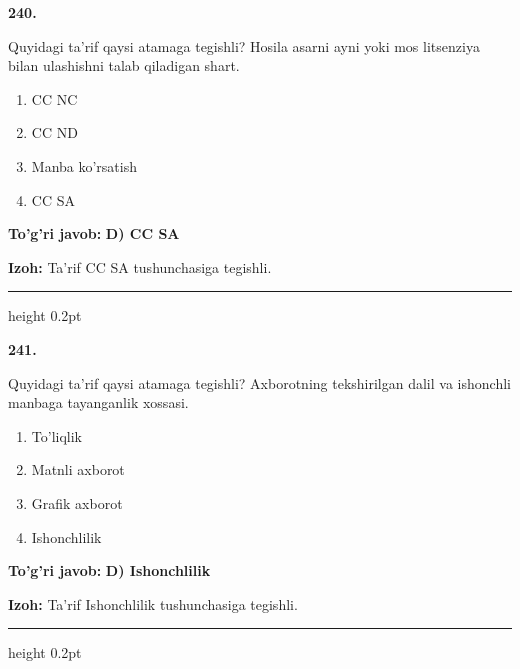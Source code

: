 \documentclass[10pt,a4paper,oneside]{article}
\begin{document}
\noindent\textbf{\color{ink}240.}
\par
Quyidagi ta'rif qaysi atamaga tegishli? Hosila asarni ayni yoki mos litsenziya bilan ulashishni talab qiladigan shart.
\begin{enumerate}[label=\Alph*),leftmargin=9mm]
\item CC NC
\item CC ND
\item Manba ko'rsatish
\item CC SA
\end{enumerate}
\begin{tcolorbox}[enhanced,breakable,colback=teal!4,colframe=teal!50!black,boxrule=0.5pt,arc=1.1mm,left=3mm,right=3mm,top=1.7mm,bottom=1.7mm,before skip=2mm,after skip=2mm]
\textbf{\color{teal}To'g'ri javob:} \textbf{D) CC SA}
\par\smallskip
\textbf{Izoh:} Ta'rif CC SA tushunchasiga tegishli.
\end{tcolorbox}
\vspace{2mm}\hrule height 0.2pt \vspace{3mm}

\noindent\textbf{\color{ink}241.}
\par
Quyidagi ta'rif qaysi atamaga tegishli? Axborotning tekshirilgan dalil va ishonchli manbaga tayanganlik xossasi.
\begin{enumerate}[label=\Alph*),leftmargin=9mm]
\item To'liqlik
\item Matnli axborot
\item Grafik axborot
\item Ishonchlilik
\end{enumerate}
\begin{tcolorbox}[enhanced,breakable,colback=teal!4,colframe=teal!50!black,boxrule=0.5pt,arc=1.1mm,left=3mm,right=3mm,top=1.7mm,bottom=1.7mm,before skip=2mm,after skip=2mm]
\textbf{\color{teal}To'g'ri javob:} \textbf{D) Ishonchlilik}
\par\smallskip
\textbf{Izoh:} Ta'rif Ishonchlilik tushunchasiga tegishli.
\end{tcolorbox}
\vspace{2mm}\hrule height 0.2pt \vspace{3mm}
\end{document}
